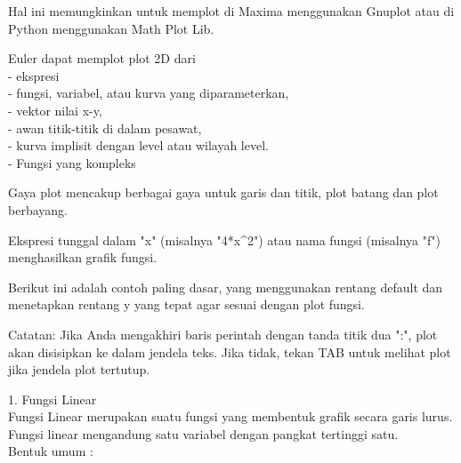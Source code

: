 \documentclass{article}
\begin{document}
\begin{eulernotebook}
\begin{eulercomment}
\begin{eulercomment}
\begin{eulercomment}
\begin{eulercomment}
\begin{eulercomment}
Hal ini memungkinkan untuk memplot di Maxima menggunakan Gnuplot atau
di Python menggunakan Math Plot Lib.

Euler dapat memplot plot 2D dari\\
- ekspresi\\
- fungsi, variabel, atau kurva yang diparameterkan,\\
- vektor nilai x-y,\\
- awan titik-titik di dalam pesawat,\\
- kurva implisit dengan level atau wilayah level.\\
- Fungsi yang kompleks

Gaya plot mencakup berbagai gaya untuk garis dan titik, plot batang
dan plot berbayang.

\begin{eulercomment}
\begin{eulercomment}
Ekspresi tunggal dalam "x" (misalnya "4*x\textasciicircum{}2") atau nama fungsi
(misalnya "f") menghasilkan grafik fungsi.

Berikut ini adalah contoh paling dasar, yang menggunakan rentang
default dan menetapkan rentang y yang tepat agar sesuai dengan plot
fungsi.

Catatan: Jika Anda mengakhiri baris perintah dengan tanda titik dua
":", plot akan disisipkan ke dalam jendela teks. Jika tidak, tekan TAB
untuk melihat plot jika jendela plot tertutup.

\end{eulercomment}
\eulersubheading{}
\begin{eulercomment}
1. Fungsi Linear\\
Fungsi Linear  merupakan suatu fungsi yang membentuk grafik secara
garis lurus. Fungsi linear mengandung satu variabel dengan pangkat
tertinggi satu.\\
Bentuk umum :


\end{eulercomment}
\end{eulercomment}
\end{eulercomment}
\end{eulercomment}
\end{eulercomment}
\end{eulercomment}
\end{eulercomment}
\end{eulernotebook}
\end{document}
